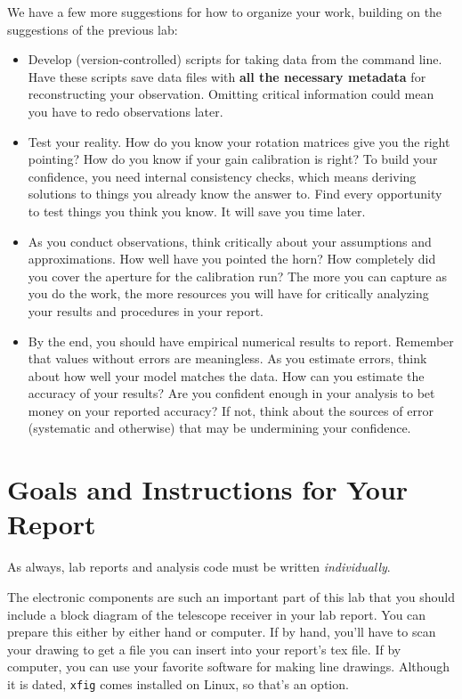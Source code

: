 \documentclass[11pt,preprint]{aastex}
\begin{document}
We have a few more suggestions for how to organize your work, building on the 
suggestions of the previous lab:
\begin{itemize}

\item Develop (version-controlled) scripts for taking data from the command line.
Have these scripts save data files with {\bf all the necessary metadata} for
reconstructing your observation. Omitting critical information could
mean you have to redo observations later.

\item Test your reality. How do you know your rotation matrices give you the
right pointing? How do you know if your gain calibration is right? To build
your confidence, you need internal consistency checks, which means deriving
solutions to things you already know the answer to. Find every opportunity
to test things you think you know. It will save you time later.

\item As you conduct observations, think critically about your assumptions and
approximations.  How well have you pointed the horn? How completely did
you cover the aperture for the calibration run? The more you can capture
as you do the work, the more resources you will have for critically analyzing your
results and procedures in your report.

\item By the end, you should have empirical numerical results to report. Remember
that values without errors are meaningless. As you estimate errors, think about how 
well your model matches the data. How can you estimate the
accuracy of your results? Are you confident enough in your analysis to
bet money on your reported accuracy? If not, think about the sources of error
(systematic and otherwise) that may be undermining your confidence.

\end{itemize}


\section{Goals and Instructions for Your Report} \label{sec:goals}

\noindent
As always, lab reports and analysis code must be written {\it individually}. 

The electronic components are such an important part of this
lab that you should include a block diagram of the telescope receiver
in your lab report. You can prepare this either by either hand or
computer. If by hand, you'll have to scan your drawing to get a file you can
insert into your report's tex file. If by computer, you can use your
favorite software for making line drawings.  Although it is dated, {\tt xfig}
comes installed on Linux, so that's an option.
\end{document}
